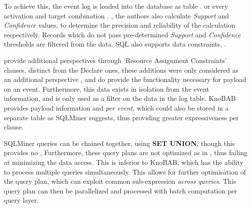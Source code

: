 To achieve this, the event log is  loaded into the database as table . or every activation and target combination . , the authors also calculate \emph{Support} and \emph{Confidence} values, to determine the precision and reliability of the calculation respectively. Records which do not pass pre-determined \emph{Support} and \emph{Confidence} thresholds are filtered from the data.  SQL also supports data constraints, .

 provide additional  perspectives through `Resource Assignment Constraints' clauses, distinct from the Declare ones, these additions were only considered as an additional perspective , and do provide the functionality necessary for payload on an event. Furthermore, this data exists in isolation from the event information, and is only used as a filter on the data in the log table. KnoBAB provides payload information  and \emph{per event}, which could also be stored in a separate table as SQLMiner suggests, thus providing greater expressiveness per clause.

SQLMiner queries can be chained together, using {\bf SET UNION}, though this provides no , Furthermore, these query plans are not optimized as in \cite{BellatrecheKB21}, thus failing at minimizing the data access. This is inferior to KnoBAB, which has the ability to process multiple queries simultaneously. This allows for further optimisation of the query plan, which can exploit common sub-expression \emph{across queries}. This query plan can then be parallelized and processed with batch computation per query layer.
